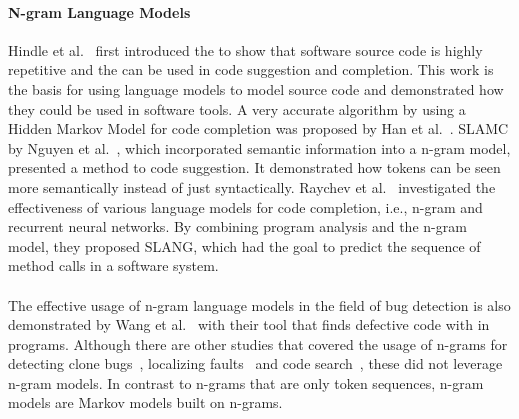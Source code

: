\paragraph{N-gram Language Models}
Hindle et al.~\cite{naturalness} first introduced the \ngram{} to show that software source code is highly repetitive and the \ngram{} can be used in code suggestion and completion. This work is the basis for using language models to model source code and demonstrated how they could be used in software tools. A very accurate algorithm by using a Hidden Markov Model for code completion was proposed by Han et al.~\cite{codecompletion}. SLAMC by Nguyen et al.~\cite{SLAMC}, which incorporated semantic information into a n-gram model, presented a method to code suggestion. It demonstrated how tokens can be seen more semantically instead of just syntactically. Raychev et al.~\cite{SLANG} investigated the effectiveness of various language models for code completion, i.e., n-gram and recurrent neural networks. By combining program analysis and the n-gram model, they proposed SLANG, which had the goal to predict the sequence of method calls in a software system. 

\paragraph{\bugram{}}
The effective usage of n-gram language models in the field of bug detection is also demonstrated by Wang et al.~\cite{bugram} with their tool \bugram{} that finds defective code with  in \java{} programs. Although there are other studies that covered the usage of n-grams for detecting clone bugs~\cite{clonebugs}, localizing faults~\cite{faults} and code search~\cite{codesearch}, these did not leverage n-gram models. In contrast to n-grams that are only token sequences, n-gram models are Markov models built on n-grams.